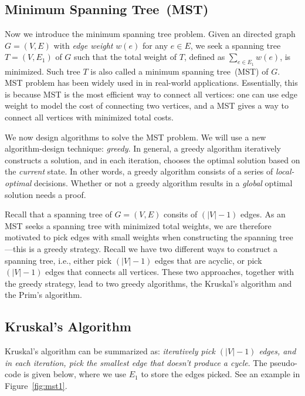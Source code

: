 \documentclass[letterpaper,11pt]{article}
\theoremstyle{mytheorem}
\begin{document}
\subsection*{Minimum Spanning Tree~(MST)}

Now we introduce the minimum spanning tree problem.
Given an directed graph $G = (V, E)$ with \emph{edge weight} $w(e)$ for any $e\in E$,
we seek a spanning tree $T = (V, E_1)$ of $G$ such that 
the total weight of $T$, defined as $\sum_{e\in E_1} w(e)$, is minimized.
Such tree $T$ is also called a minimum spanning tree~(MST) of $G$.
MST problem has been widely used in in real-world applications.
Essentially, this is because MST is the most efficient way to connect all
vertices: one can use edge weight to model the cost of connecting
two vertices, and a MST gives a way to connect all vertices with minimized total costs.

We now design algorithms to solve the MST problem.
We will use a new algorithm-design technique: \emph{greedy}.
In general, a greedy algorithm iteratively constructs a solution,
and in each iteration, chooses the optimal solution based on the \emph{current} state.
In other words, a greedy algorithm consists of a series of \emph{local-optimal} decisions.
Whether or not a greedy algorithm results in a \emph{global} optimal solution
needs a proof.

Recall that a spanning tree of $G = (V, E)$ consits of $(|V| - 1)$ edges.
As an MST seeks a spanning tree with minimized total weights,
we are therefore motivated to pick edges with small weights when constructing
the spanning tree---this is a greedy strategy.
Recall we have two different ways to construct a spanning tree, i.e., 
either pick $(|V|-1)$ edges that are acyclic,
or pick $(|V|-1)$ edges that connects all vertices.
These two approaches, together with the greedy strategy,
lead to two greedy algorithms, the Kruskal's algorithm and the Prim's algorithm.

\subsection*{Kruskal's Algorithm}

Kruskal's algorithm can be summarized as: \emph{iteratively pick $(|V|-1)$ edges,
and in each iteration, pick the smallest edge that doesn't produce a cycle}.
The pseudo-code is given below, where we use $E_1$ to store
the edges picked. See an example in Figure~\ref{fig:mst1}.
\end{document}
